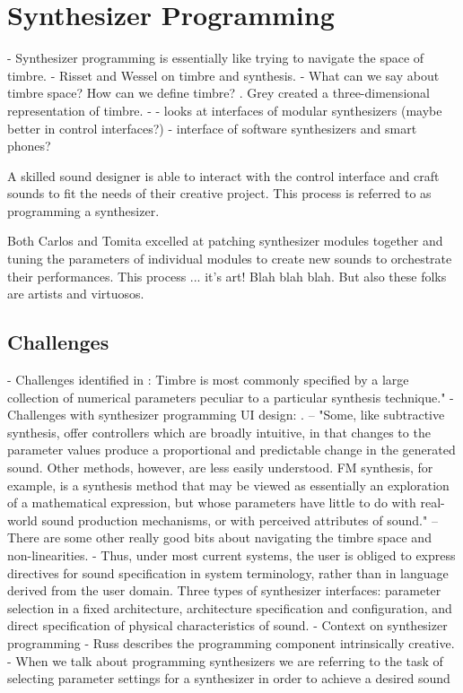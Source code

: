 \section{Synthesizer Programming}

- Synthesizer programming is essentially like trying to navigate the space of timbre.
- Risset and Wessel \cite{risset1999exploration} on timbre and synthesis.
- What can we say about timbre space? How can we define timbre? \cite{grey1977multidimensional}. Grey created a three-dimensional representation of timbre.
- \cite{bates2021interface} - looks at interfaces of modular synthesizers (maybe better in control interfaces?) 
- \cite{d2016interface} interface of software synthesizers and smart phones?

A skilled sound designer is able to interact with the control interface and craft sounds to fit the needs of their creative project. This process is referred to as programming a synthesizer. 

Both Carlos and Tomita excelled at patching synthesizer modules together and tuning the parameters of individual modules to create new sounds to orchestrate their performances. This process ... it's art! Blah blah blah. But also these folks are artists and virtuosos.

\subsection{Challenges}
- Challenges identified in \cite{ethington1994seawave}: Timbre is most commonly specified by a large collection of numerical parameters peculiar to a particular synthesis technique."
- Challenges with synthesizer programming UI design: \cite{seago2013new}. -- "Some, like subtractive synthesis, offer controllers which are broadly intuitive, in that changes to the parameter values produce a proportional and predictable change in the generated sound. Other methods, however, are less easily understood. FM synthesis, for example, is a synthesis method that may be viewed as essentially an exploration of a mathematical expression, but whose parameters have little to do with real-world sound production mechanisms, or with perceived attributes of sound." -- There are some other really good bits about navigating the timbre space and non-linearities.
- \cite{seago2004critical} Thus, under most current systems, the user is obliged to express directives for sound specification in system terminology, rather than in language derived from the user domain. Three types of synthesizer interfaces: parameter selection in a fixed architecture, architecture specification and configuration, and direct specification of physical characteristics of sound.
- Context on synthesizer programming \cite{jenkins2019analog}
- Russ describes the programming component intrinsically creative.
- When we talk about programming synthesizers we are referring to the task of selecting parameter settings for a synthesizer in order to achieve a desired sound

